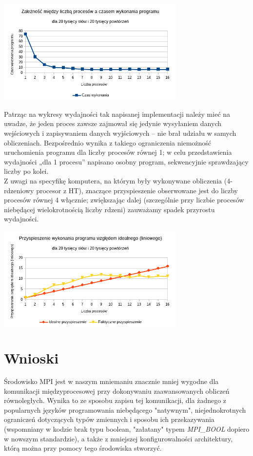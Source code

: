 \documentclass[a4paper,12pt]{article}
\begin{document}
\begin{center}
\includegraphics[width=0.7\textwidth]{data/wykonanieProgramu.png}
\end{center}

Patrząc na wykresy wydajności tak napisanej implementacji należy mieć na uwadze, że jeden proces zawsze zajmował się jedynie wysyłaniem danych wejściowych i zapisywaniem danych wyjściowych – nie brał udziału w samych obliczeniach. Bezpośrednio wynika z takiego ograniczenia niemożność uruchomienia programu dla liczby procesów równej 1; w celu przedstawienia wydajności „dla 1 procesu” napisano osobny program, sekwencyjnie sprawdzający liczby po kolei. \\

Z uwagi na specyfikę komputera, na którym były wykonywane obliczenia (4-rdzeniowy procesor z HT), znaczące przyspieszenie obserwowane jest do liczby procesów równej 4 włącznie; zwiększając dalej (szczególnie przy liczbie procesów niebędącej wielokrotnością liczby rdzeni) zauważamy spadek przyrostu wydajności.

\begin{center}
\includegraphics[width=0.7\textwidth]{data/przyspieszenie.png}
\end{center}

\section*{Wnioski}
Środowisko MPI jest w naszym mniemaniu znacznie mniej wygodne dla komunikacji międzyprocesowej przy dokonywaniu zaawansowanych obliczeń równoległych. Wynika to ze sposobu zapisu tej komunikacji, dla żadnego z popularnych języków programowania niebędącego "natywnym", niejednokrotnych ograniczeń dotyczących typów zmiennych i sposobu ich przekazywania (wspomniany w kodzie brak typu boolean, "załatany" typem \emph{MPI\_BOOL} dopiero w nowszym standardzie), a także z mniejszej konfigurowalności architektury, którą można przy pomocy tego środowiska stworzyć.
\end{document}
